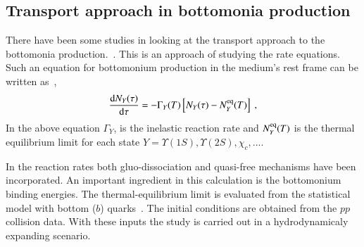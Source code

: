 {\subsection{Transport approach in bottomonia production }

There have been some studies in looking at the transport approach to the bottomonia 
production.~\cite{Grandchamp:2005yw,Rapp:2017chc}. This 
is an approach of studying the rate equations. Such an equation for bottomonium production  in the medium's rest frame can be written as~\cite{Grandchamp:2005yw},
\begin{equation}
\frac{\mathrm{d} N_Y(\tau)}{\mathrm{d}\tau} =
-\Gamma_Y(T)\left[N_Y(\tau)-N^{\rm eq}_Y(T)\right] \ ,
\end{equation}
In the above equation $\Gamma_Y$, is the inelastic reaction rate  and $N^{\rm eq}_Y(T)$ is the thermal equilibrium limit  for each state $Y=\Upsilon(1S), \Upsilon(2S), \chi_c, ...$.

In the reaction rates  both gluo-dissociation and quasi-free mechanisms have been incorporated.  An important 
ingredient in this calculation is the bottomonium binding energies. 
The thermal-equilibrium limit is evaluated from the statistical model with bottom ($b$) quarks~\cite{Grandchamp:2002wp}. 
The initial conditions are obtained from the $pp$ collision data. With these inputs the study is carried out in a hydrodynamicaly 
expanding scenario.  




}

